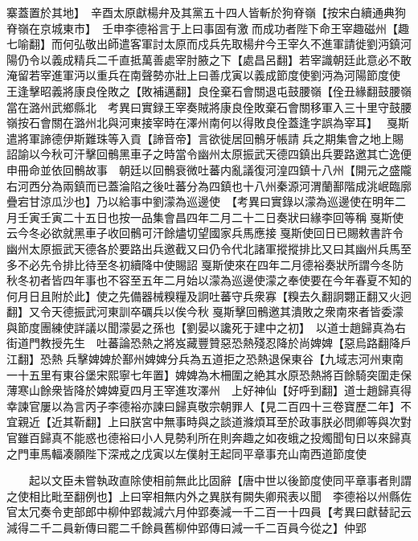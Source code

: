 寨蓋置於其地】　辛酉太原獻楊弁及其黨五十四人皆斬於狗脊嶺【按宋白續通典狗脊嶺在京城東市】　壬申李德裕言于上曰事固有激而成功者陛下命王宰趣磁州【趣七喻翻】而何弘敬出師遣客軍討太原而戍兵先取楊弁今王宰久不進軍請徙劉沔鎮河陽仍令以義成精兵二千直抵萬善處宰肘腋之下【處昌呂翻】若宰識朝廷此意必不敢淹留若宰進軍沔以重兵在南聲勢亦壯上曰善戊寅以義成節度使劉沔為河陽節度使　王逢擊昭義將康良佺敗之【敗補邁翻】良佺棄石會關退屯鼓腰嶺【佺丑緣翻鼓腰嶺當在潞州武鄉縣北　考異曰實録王宰奏賊將康良佺敗棄石會關移軍入三十里守鼓腰嶺按石會關在潞州北與河東接宰時在澤州南何以得敗良佺蓋逢字誤為宰耳】　戛斯遣將軍諦德伊斯難珠等入貢【諦音帝】言欲徙居回鶻牙帳請兵之期集會之地上賜詔諭以今秋可汗擊回鶻黑車子之時當令幽州太原振武天德四鎮出兵要路邀其亡逸便申冊命並依回鶻故事　朝廷以回鶻衰微吐蕃内亂議復河湟四鎮十八州【開元之盛隴右河西分為兩鎮而已蓋淪陷之後吐蕃分為四鎮也十八州秦源河渭蘭鄯階成洮岷臨廓疊宕甘涼瓜沙也】乃以給事中劉濛為巡邊使　【考異曰實錄以濛為巡邊使在明年二月壬寅壬寅二十五日也按一品集會昌四年二月二十二日奏狀曰緣李回等稱戛斯使云今冬必欲就黑車子收回鶻可汗餘燼切望國家兵馬應接戛斯使回日已賜敕書許令幽州太原振武天德各於要路出兵邀截又曰仍令代北諸軍摐摐排比又曰其幽州兵馬至多不必先令排比待至冬初續降中使賜詔戛斯使來在四年二月德裕奏狀所謂今冬防秋冬初者皆四年事也不容至五年二月始以濛為巡邊使濛之奉使要在今年春夏不知的何月日且附於此】使之先備器械糗糧及詗吐蕃守兵衆寡【糗去久翻詗翾正翻又火迥翻】又令天德振武河東訓卒礪兵以俟今秋戛斯擊回鶻邀其潰敗之衆南來者皆委濛與節度團練使詳議以聞濛晏之孫也【劉晏以讒死于建中之初】　以道士趙歸真為右街道門教授先生　吐蕃論恐熱之將岌藏豐贊惡恐熱殘忍降於尚婢婢【惡烏路翻降戶江翻】恐熱兵擊婢婢於鄯州婢婢分兵為五道拒之恐熱退保東谷【九域志河州東南一十五里有東谷堡宋熙寧七年置】婢婢為木柵圍之絶其水原恐熱將百餘騎突圍走保薄寒山餘衆皆降於婢婢夏四月王宰進攻澤州　上好神仙【好呼到翻】道士趙歸真得幸諫官屢以為言丙子李德裕亦諫曰歸真敬宗朝罪人【見二百四十三卷寶歷二年】不宜親近【近其靳翻】上曰朕宮中無事時與之談道滌煩耳至於政事朕必問卿等與次對官雖百歸真不能惑也德裕曰小人見勢利所在則奔趣之如夜蛾之投燭聞旬日以來歸真之門車馬輻凑願陛下深戒之戊寅以左僕射王起同平章事充山南西道節度使

　　起以文臣未嘗執政直除使相前無此比固辭【唐中世以後節度使同平章事者則謂之使相比毗至翻例也】上曰宰相無内外之異朕有闕失卿飛表以聞　李德裕以州縣佐官太冗奏令吏部郎中柳仲郢裁減六月仲郢奏減一千二百一十四員【考異曰獻替記云減得二千二員新傳曰罷二千餘員舊柳仲郢傳曰減一千二百員今從之】仲郢


